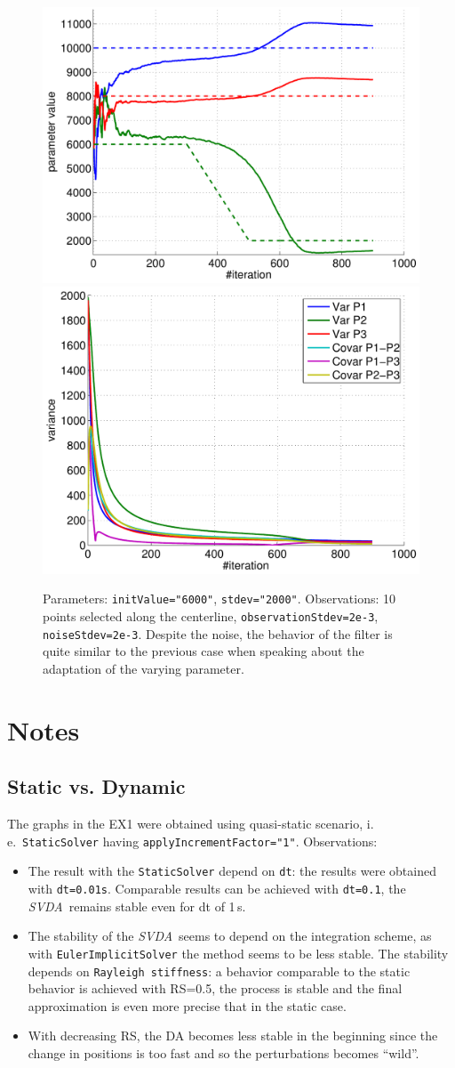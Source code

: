 \documentclass[10pt]{article}
\def\ie{i.\,e.}
\def\svda{\textit{SVDA}}
\begin{document}
\begin{figure}[h]
\begin{center}
\includegraphics[width=.49\linewidth]{figures/pVar3_estim.pdf}
\hfill
\includegraphics[width=.49\linewidth]{figures/pVar3_var.pdf}
\caption{Parameters: \texttt{initValue="6000"}, \texttt{stdev="2000"}. Observations: 10 points selected along the centerline,
\texttt{observationStdev=2e-3}, \texttt{noiseStdev=2e-3}. Despite the noise, the behavior of the filter is quite similar to the previous case when speaking about the adaptation of the 
varying parameter.}
\label{fig:Results1}
\end{center}
\end{figure}


\section{Notes}

\subsection{Static vs. Dynamic}
The graphs in the EX1 were obtained using quasi-static scenario, \ie\ \texttt{StaticSolver} having \texttt{applyIncrementFactor="1"}. Observations:
\begin{itemize}
 \item The result with the \texttt{StaticSolver} depend on \texttt{dt}: the results were obtained with \texttt{dt=0.01s}. Comparable results can be
achieved with \texttt{dt=0.1}, 
 the \svda\ remains stable even for dt of 1\,s.
 \item The stability of the \svda\ seems to depend on the integration scheme, as with \texttt{EulerImplicitSolver} the method seems to be less stable.
The stability depends on \texttt{Rayleigh stiffness}: a behavior comparable to the static behavior is achieved with RS=0.5, the process is stable and
the final approximation is even more precise that in the static case. 
\item With decreasing RS, the DA becomes less stable in the beginning since the change in positions is too fast and so the perturbations becomes
``wild''. 
\end{itemize}
\end{document}
